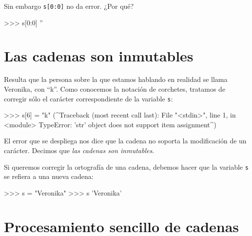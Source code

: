 Sin embargo \lstinline+s[0:0]+ no da error. ¿Por qué?

\begin{codigo-python-sn}
>>> s[0:0]
''
\end{codigo-python-sn}



\section{Las cadenas son inmutables}

Resulta que la persona sobre la que estamos hablando en realidad se llama
Veronika, con ``k''.  Como conocemos la notación de corchetes,
tratamos de corregir sólo el carácter correspondiente de la variable
\lstinline!s!:

\begin{codigo-python-sn}
>>> s[6] = "k"
(^Traceback (most recent call last):
  File "<stdin>", line 1, in <module>
TypeError: 'str' object does not support item assignment^)
\end{codigo-python-sn}

El error que se despliega nos dice que la cadena no soporta
la modificación de un carácter. Decimos que \emph{las cadenas
son inmutables}.

Si queremos corregir la ortografía de una cadena, debemos hacer
que la variable \lstinline!s! se refiera a una nueva cadena:

\begin{codigo-python-sn}
>>> s = "Veronika"
>>> s
'Veronika'
\end{codigo-python-sn}

\section{Procesamiento sencillo de cadenas}



